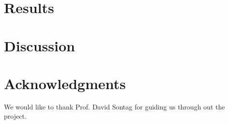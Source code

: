 \documentclass[10pt]{article}
\begin{document}
\section*{Results}

\section*{Discussion}

\section*{Acknowledgments}

We would like to thank Prof. David Sontag for guiding us through out the project.


\end{document}

